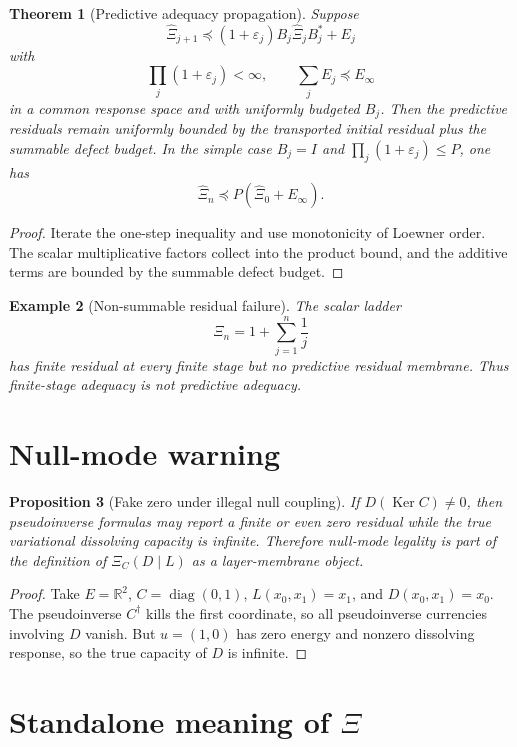 \documentclass[11pt]{article}
\newtheorem{theorem}{Theorem}[section]
\newtheorem{proposition}[theorem]{Proposition}
\newtheorem{example}[theorem]{Example}
\newcommand{\Ker}{\operatorname{Ker}}
\begin{document}
\begin{theorem}[Predictive adequacy propagation]
Suppose
\[
\widehat\Xi_{j+1}\preceq (1+\varepsilon_j)B_j\widehat\Xi_jB_j^*+E_j
\]
with
\[
\prod_j(1+\varepsilon_j)<\infty,
\qquad
\sum_j E_j\preceq E_\infty
\]
in a common response space and with uniformly budgeted $B_j$.  Then the predictive residuals remain uniformly bounded by the transported initial residual plus the summable defect budget.  In the simple case $B_j=I$ and $\prod_j(1+\varepsilon_j)\le P$, one has
\[
\boxed{
\widehat\Xi_n\preceq P(\widehat\Xi_0+E_\infty).
}
\]
\end{theorem}

\begin{proof}
Iterate the one-step inequality and use monotonicity of Loewner order.  The scalar multiplicative factors collect into the product bound, and the additive terms are bounded by the summable defect budget.
\end{proof}

\begin{example}[Non-summable residual failure]
The scalar ladder
\[
\Xi_n=1+\sum_{j=1}^n\frac1j
\]
has finite residual at every finite stage but no predictive residual membrane.  Thus finite-stage adequacy is not predictive adequacy.
\end{example}

\section{Null-mode warning}

\begin{proposition}[Fake zero under illegal null coupling]
If $D(\Ker C)\ne0$, then pseudoinverse formulas may report a finite or even zero residual while the true variational dissolving capacity is infinite.  Therefore null-mode legality is part of the definition of $\Xi_C(D\mid L)$ as a layer-membrane object.
\end{proposition}

\begin{proof}
Take $E=\mathbb R^2$, $C=\operatorname{diag}(0,1)$, $L(x_0,x_1)=x_1$, and $D(x_0,x_1)=x_0$.  The pseudoinverse $C^\dagger$ kills the first coordinate, so all pseudoinverse currencies involving $D$ vanish.  But $u=(1,0)$ has zero energy and nonzero dissolving response, so the true capacity of $D$ is infinite.
\end{proof}

\section{Standalone meaning of $\Xi$}
\end{document}
